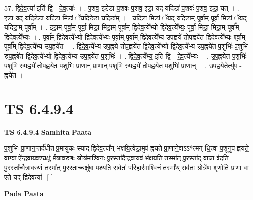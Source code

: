 \documentclass[17pt]{extarticle}
\begin{document}
57. द्वि॒दे॒व॒त्या॑ इति॑ द्वि - दे॒व॒त्याः᳚ । . प॒शव॒ इडेडा॑ प॒शवः॑ प॒शव॒ इडा॒ यद् यदिडा॑ प॒शवः॑ प॒शव॒ इडा॒ यत् । . इडा॒ यद् यदिडेडा॒ यदिडा॒ मिडां॒ ॅयदिडेडा॒ यदिडा᳚म् । . यदिडा॒ मिडां॒ ॅयद् यदिडा॒म् पूर्वा॒म् पूर्वा॒ मिडां॒ ॅयद् यदिडा॒म् पूर्वा᳚म् । . इडा॒म् पूर्वा॒म् पूर्वा॒ मिडा॒ मिडा॒म् पूर्वा᳚म् द्विदेव॒त्ये᳚भ्यो द्विदेव॒त्ये᳚भ्यः॒ पूर्वा॒ मिडा॒ मिडा॒म् पूर्वा᳚म् द्विदेव॒त्ये᳚भ्यः । . पूर्वा᳚म् द्विदेव॒त्ये᳚भ्यो द्विदेव॒त्ये᳚भ्यः॒ पूर्वा॒म् पूर्वा᳚म् द्विदेव॒त्ये᳚भ्य उप॒ह्वये॑ तोप॒ह्वये॑त द्विदेव॒त्ये᳚भ्यः॒ पूर्वा॒म् पूर्वा᳚म् द्विदेव॒त्ये᳚भ्य उप॒ह्वये॑त । . द्वि॒दे॒व॒त्ये᳚भ्य उप॒ह्वये॑ तोप॒ह्वये॑त द्विदेव॒त्ये᳚भ्यो द्विदेव॒त्ये᳚भ्य उप॒ह्वये॑त प॒शुभिः॑ प॒शुभि॑ रुप॒ह्वये॑त द्विदेव॒त्ये᳚भ्यो द्विदेव॒त्ये᳚भ्य उप॒ह्वये॑त प॒शुभिः॑ । . द्वि॒दे॒व॒त्ये᳚भ्य॒ इति॑ द्वि - दे॒व॒त्ये᳚भ्यः । . उ॒प॒ह्वये॑त प॒शुभिः॑ प॒शुभि॑ रुप॒ह्वये॑ तोप॒ह्वये॑त प॒शुभिः॑ प्रा॒णान् प्रा॒णान् प॒शुभि॑ रुप॒ह्वये॑
तोप॒ह्वये॑त प॒शुभिः॑ प्रा॒णान् । . उ॒प॒ह्वये॒तेत्यु॑प - ह्वये॑त । \newline
\pagebreak
{}

\section{ TS 6.4.9.4 }

\textbf{TS 6.4.9.4 } \newline
\textbf{Samhita Paata} \newline

प॒शुभिः॑ प्रा॒णान॒न्तर्द॑धीत प्र॒मायु॑कः स्याद् द्विदेव॒त्या᳚न् भक्षयि॒त्वेडा॒मुप॑ ह्वयते प्रा॒णाने॒वाऽऽ*त्मन् धि॒त्वा प॒शूनुप॑ ह्वयते॒ वाग्वा ऐ᳚न्द्रवाय॒वश्चक्षु॑-र्मैत्रावरु॒णः श्रोत्र॑माश्वि॒नः पु॒रस्ता॑दैन्द्रवाय॒वं भ॑क्षयति॒ तस्मा᳚त् पु॒रस्ता᳚द् वा॒चा व॑दति पु॒रस्ता᳚न्मैत्रावरु॒णं तस्मा᳚त् पु॒रस्ता॒च्चक्षु॑षा पश्यति स॒र्वतः॑ परि॒हार॑माश्वि॒नं तस्मा᳚थ् स॒र्वतः॒ श्रोत्रे॑ण शृणोति प्रा॒णा वा ए॒ते यद् द्वि॑देव॒त्या॑- [  ] \newline

\textbf{Pada Paata} \newline
\end{document}
